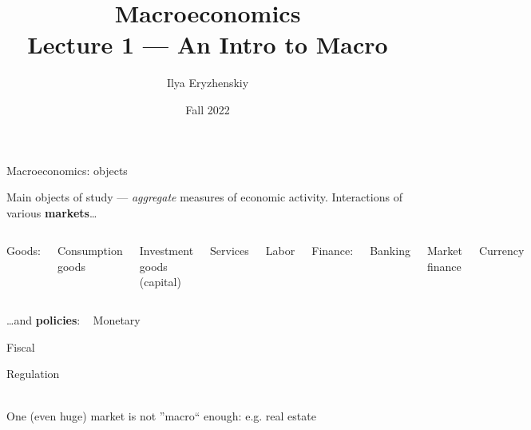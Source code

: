\documentclass{beamer}
\title[PSME]{Macroeconomics\\ Lecture 1 --- An Intro to Macro }
\author[I. Eryzhenskiy]{Ilya Eryzhenskiy}
\institute[BdF]{PSME Panth\'{e}on-Sorbonne Master in Economics}
\date[PSME macro]{Fall 2022}
\newenvironment{mytemize}
{\vfill\itemize[nolistsep,itemsep=\fill,label=\color{blue}{$\triangleright$}]}
  {\enditemize}
\newcommand{\hitem}[1]{
  {\color{blue}{$\triangleright$}} 
  {#1} 
  {\hfill}
}
\begin{document}
\begin{frame}
\maketitle
\end{frame}

\begin{frame}{%
\protect\hypertarget{macroeconomics-object-of-study}{%
Macroeconomics: objects}}

Main objects of study --- \emph{aggregate} measures of economic activity.
\vfill
Interactions of various \textbf{markets}\ldots{}
\vfill
\begin{columns}[c]
  \begin{mytemize}
\item
  Goods:

  \begin{mytemize}
  \item
    Consumption goods
  \item
    Investment goods (capital)
  \end{mytemize}
\item
  Services
  \end{mytemize}
\begin{mytemize}
 
\item
  Labor
\item
  Finance:

  \begin{mytemize}
   
  \item
    Banking
  \item
    Market finance
  \end{mytemize}
\item
  Currency
\end{mytemize}

\end{columns}
\vfill
\ldots{}and \textbf{policies}: 
\vfill
\ 
\hitem{Monetary}
\hitem{Fiscal}
\hitem{Regulation}
\\
\vfill
One (even huge) market is not ''macro`` enough: e.g. real estate

\end{frame}
\end{document}
